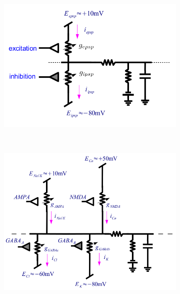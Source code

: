 \documentclass[a4paper, 12pt]{article}
\begin{document}
\begin{figure}[H]
	\centering
	\begin{subfigure}[b]{0.5\textwidth}
    	\centering
		\includegraphics[width=\textwidth]{ex-inhib-elec-membrane.png}
	\end{subfigure}%
	~
	\begin{subfigure}[b]{0.5\textwidth}
		\centering
		\includegraphics[width=\textwidth]{AMPA-NMDA-GABA-elec-membrane.png}
	\end{subfigure}
\end{figure}
\end{document}
